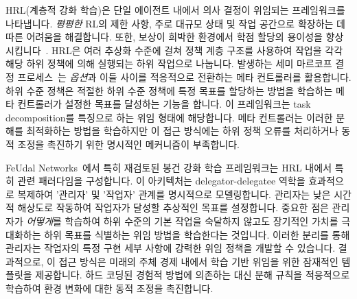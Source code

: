 \documentclass[11pt, a4paper, twocolumn, copyright, goog]{google}
\begin{document}
HRL(계층적 강화 학습)은 \citep{barto2003recent, botvinick2012hierarchical, vezhnevets2017feudal, nachum2018data, pateria2021hierarchical, zhang2024price} 단일 에이전트 내에서 의사 결정이 위임되는 프레임워크를 나타냅니다. \emph{평평한} RL의 제한 사항, 주로 대규모 상태 및 작업 공간으로 확장하는 데 따른 어려움을 해결합니다. 또한, 보상이 희박한 환경에서 학점 할당의 용이성을 향상시킵니다~\citep{pignatelli2023survey}. HRL은 여러 추상화 수준에 걸쳐 정책 계층 구조를 사용하여 작업을 각각 해당 하위 정책에 의해 실행되는 하위 작업으로 나눕니다. 발생하는 세미 마르코프 결정 프로세스~\citep{sutton1999between}는 \emph{옵션}과 이들 사이를 적응적으로 전환하는 메타 컨트롤러를 활용합니다. 하위 수준 정책은 적절한 하위 수준 정책에 특정 목표를 할당하는 방법을 학습하는 메타 컨트롤러가 설정한 목표를 달성하는 기능을 합니다. 이 프레임워크는 task decomposition를 특징으로 하는 위임 형태에 해당합니다. 메타 컨트롤러는 이러한 분해를 최적화하는 방법을 학습하지만 이 접근 방식에는 하위 정책 오류를 처리하거나 동적 조정을 촉진하기 위한 명시적인 메커니즘이 부족합니다.

FeUdal Networks~\citep{vezhnevets2017feudalnetworkshierarchicalreinforcement}에서 특히 재검토된 봉건 강화 학습 프레임워크는 HRL 내에서 특히 관련 패러다임을 구성합니다. 이 아키텍처는 delegator-delegatee 역학을 효과적으로 복제하여 '관리자' 및 '작업자' 관계를 명시적으로 모델링합니다. 관리자는 낮은 시간적 해상도로 작동하여 작업자가 달성할 추상적인 목표를 설정합니다. 중요한 점은 관리자가 \textit{어떻게}를 학습하여 하위 수준의 기본 작업을 숙달하지 않고도 장기적인 가치를 극대화하는 하위 목표를 식별하는 위임 방법을 학습한다는 것입니다. 이러한 분리를 통해 관리자는 작업자의 특정 구현 세부 사항에 강력한 위임 정책을 개발할 수 있습니다. 결과적으로, 이 접근 방식은 미래의 주체 경제 내에서 학습 기반 위임을 위한 잠재적인 템플릿을 제공합니다.  하드 코딩된 경험적 방법에 의존하는 대신 분해 규칙을 적응적으로 학습하여 환경 변화에 대한 동적 조정을 촉진합니다.
\end{document}
